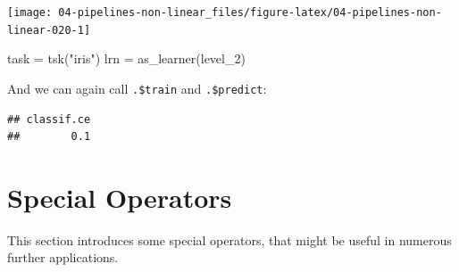 \documentclass[
]{scrbook}
\newenvironment{Shaded}{\begin{snugshade}}{\end{snugshade}}
\newcommand{\AttributeTok}[1]{\textcolor[rgb]{0.77,0.63,0.00}{#1}}
\newcommand{\CommentTok}[1]{\textcolor[rgb]{0.56,0.35,0.01}{\textit{#1}}}
\newcommand{\ConstantTok}[1]{\textcolor[rgb]{0.00,0.00,0.00}{#1}}
\newcommand{\DecValTok}[1]{\textcolor[rgb]{0.00,0.00,0.81}{#1}}
\newcommand{\FunctionTok}[1]{\textcolor[rgb]{0.00,0.00,0.00}{#1}}
\newcommand{\NormalTok}[1]{#1}
\newcommand{\OtherTok}[1]{\textcolor[rgb]{0.56,0.35,0.01}{#1}}
\newcommand{\SpecialCharTok}[1]{\textcolor[rgb]{0.00,0.00,0.00}{#1}}
\newcommand{\StringTok}[1]{\textcolor[rgb]{0.31,0.60,0.02}{#1}}
\renewenvironment{Shaded} {\begin{snugshade}\small} {\end{snugshade}}
\begin{document}
\begin{Shaded}
\end{Shaded}

\begin{center}\texttt{[image: 04-pipelines-non-linear\_files/figure-latex/04-pipelines-non-linear-020-1]} \end{center}

\begin{Shaded}
\begin{Highlighting}[]
\NormalTok{task }\OtherTok{=} \FunctionTok{tsk}\NormalTok{(}\StringTok{"iris"}\NormalTok{)}
\NormalTok{lrn }\OtherTok{=} \FunctionTok{as\_learner}\NormalTok{(level\_2)}
\end{Highlighting}
\end{Shaded}

And we can again call \texttt{.\$train} and \texttt{.\$predict}:

\begin{Shaded}
\end{Shaded}

\begin{verbatim}
## classif.ce 
##        0.1
\end{verbatim}

\hypertarget{pipe-special-ops}{%
\section{Special Operators}\label{pipe-special-ops}}

This section introduces some special operators, that might be useful in numerous further applications.
\end{document}
